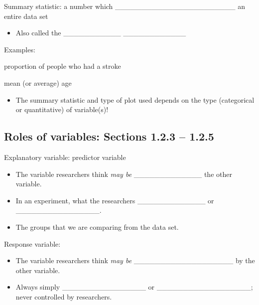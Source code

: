 \documentclass[
]{report}
\providecommand{\tightlist}{%
  \setlength{\itemsep}{0pt}\setlength{\parskip}{0pt}}
\newcommand{\rgi}{\hspace{24pt}}  %
\begin{document}
Summary statistic: a number which \_\_\_\_\_\_\_\_\_\_\_\_\_\_\_\_\_\_\_\_\_\_\_ an entire data set

\begin{itemize}
\tightlist
\item
  Also called the \_\_\_\_\_\_\_\_\_\_\_ \_\_\_\_\_\_\_\_\_\_\_\_
\end{itemize}

\rgi Examples:

\rgi \rgi proportion of people who had a stroke

\vspace{0.3in}

\rgi \rgi mean (or average) age

\vspace{0.3in}

\begin{itemize}
\tightlist
\item
  The summary statistic and type of plot used depends on the type (categorical or quantitative) of variable(s)!
\end{itemize}

\newpage

\hypertarget{roles-of-variables-sections-1.2.3-1.2.5}{%
\subsection*{Roles of variables: Sections 1.2.3 -- 1.2.5}\label{roles-of-variables-sections-1.2.3-1.2.5}}

Explanatory variable: predictor variable

\begin{itemize}
\item
  The variable researchers think \emph{may be} \_\_\_\_\_\_\_\_\_\_\_\_\_
  the other variable.
\item
  In an experiment, what the researchers \_\_\_\_\_\_\_\_\_\_\_\_\_ or \_\_\_\_\_\_\_\_\_\_\_\_\_\_\_\_.
\item
  The groups that we are comparing from the data set.
\end{itemize}

Response variable:

\begin{itemize}
\item
  The variable researchers think \emph{may be} \_\_\_\_\_\_\_\_\_\_\_\_\_\_\_\_\_\_\_ by the other variable.
\item
  Always simply \_\_\_\_\_\_\_\_\_\_\_\_\_\_\_\_ or \_\_\_\_\_\_\_\_\_\_\_\_\_\_\_\_\_\_; never controlled by researchers.
\end{itemize}
\end{document}
